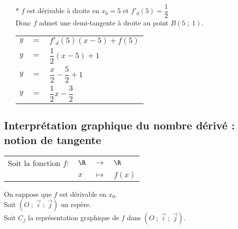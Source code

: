 \begin{itemize}
\begin{itemize}
\item[*] $f$ est dérivable à droite en $x_0 = 5$ et $f'_d(5) = \dfrac{1}{2}$ \\ 

Donc $f$ admet une demi-tangente à droite au point $B(5 \; ; \; 1)$. \\

\begin{tabular}{lll}
$y$ & $=$ & $f'_d(5)(x-5)+f(5)$ \vspace*{.3cm} \\
$y$ & $=$ & $\dfrac{1}{2}(x-5) + 1$ \vspace*{.3cm} \\
$y$ & $=$ & $\dfrac{x}{2} - \dfrac{5}{2} + 1$ \vspace*{.3cm} \\
$y$ & $=$ & $\dfrac{1}{2}x - \dfrac{3}{2}$ \vspace*{.3cm} \\
\end{tabular}
\end{itemize}
\end{itemize}

\newpage

\vspace*{-1cm}

\subsection{Interprétation graphique du nombre dérivé : notion de tangente}

\begin{tabular}{llll}
Soit la fonction $f : $ & $\R$ & $\longrightarrow$ & $\R$ \\
& $x$ & $\longmapsto$ & $f(x)$ \\
\end{tabular}

On suppose que $f$ est dérivable en $x_0$. \\

Soit $\left(O\; ; \; \overrightarrow{i} \; ; \; \overrightarrow{j}\right)$ un repère. \\

Soit $C_f$ la représentation graphique de $f$ dans $\left(O\; ; \; \overrightarrow{i} \; ; \; \overrightarrow{j}\right)$. \\


